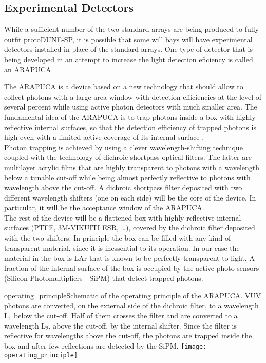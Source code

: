 \subsection{Experimental Detectors}
While a sufficient number of the two standard arrays are being produced to
fully outfit protoDUNE-SP, it is possible that some will bays will have 
experimental detectors installed in place of the standard arrays.  
One type of detector that is being developed in an attempt to increase the
light detection eficiency is called an ARAPUCA.

The ARAPUCA is a device based on a new technology that should allow to collect photons with a large area window with detection efficiencies at the level of several percent 
while using active photon detectors with much smaller area.
The fundamental idea of the ARAPUCA is to trap photons inside a box with highly reflective internal surfaces, so that the detection efficiency of trapped photons is high even with a 
limited active coverage of its internal surface \cite{arapuca_jinst}.\\

Photon trapping is achieved by using a clever wavelength-shifting technique coupled with the technology of dichroic shortpass optical filters. The latter are multilayer acrylic films that are
highly transparent to photons with a wavelength below a tunable cut-off while being almost perfectly reflective to photons with wavelength above the cut-off. 
A dichroic shortpass filter deposited with two different wavelength shifters (one on each side) will be the core of the device. In particular, it will be the acceptance window of the 
ARAPUCA.\\
The rest of the device will be a flattened box with highly reflective internal surfaces (PTFE, 3M-VIKUITI ESR, \dots), covered by the 
dichroic filter deposited with the two shifters. In principle the box can be filled with any kind of transparent material, since it is inessential to its operation. In our case the material in the 
box is LAr that is known to be perfectly transparent to light.
A fraction of the internal surface of the box is occupied by the active photo-sensors (Silicon Photomultipliers - SiPM) that detect trapped photons.\\

\begin{cdrfigure}{operating_principle}{Schematic of the operating principle of the ARAPUCA. VUV photons are converted, on the external side of the dichroic filter, to a wavelength L$_1$ below the cut-off. Half of 
them crosses the filter and are converted to a wavelength L$_2$, above the cut-off, by the internal shifter. Since the filter is reflective for wavelengths above the cut-off, the photons are 
trapped inside the box and after few reflections are detected by the SiPM.}
\texttt{[image: operating\_principle]}
\end{cdrfigure}

